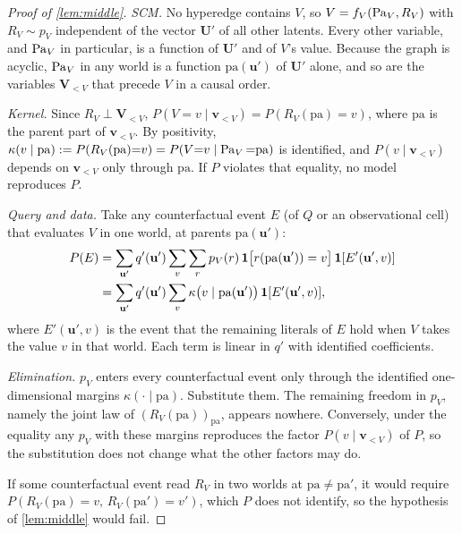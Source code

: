 \begin{proof}[Proof of \cref{lem:middle}]
\emph{SCM.} No hyperedge contains $V$, so $V=f_V(\operatorname{Pa}_V,R_V)$ with
$R_V\sim p_V$ independent of the vector $\mathbf{U}'$ of all other latents.
Every other variable, and $\operatorname{Pa}_V$ in particular, is a function of
$\mathbf{U}'$ and of $V$'s value. Because the graph is acyclic, $\operatorname{Pa}_V$ in
any world is a function $\mathrm{pa}(\mathbf{u}')$ of $\mathbf{U}'$ alone, and
so are the variables $\mathbf{V}_{<V}$ that precede $V$ in a causal order.

\emph{Kernel.} Since $R_V\perp\mathbf{V}_{<V}$,
$P(V{=}v\mid\mathbf{v}_{<V})=P(R_V(\mathrm{pa}){=}v)$, where $\mathrm{pa}$ is
the parent part of $\mathbf{v}_{<V}$. By positivity,
$\kappa(v\mid\mathrm{pa}):=P(R_V(\mathrm{pa}){=}v)=P(V{=}v\mid\operatorname{Pa}_V{=}\mathrm{pa})$
is identified, and $P(v\mid\mathbf{v}_{<V})$ depends on $\mathbf{v}_{<V}$ only
through $\mathrm{pa}$. If $P$ violates that equality, no model reproduces $P$.

\emph{Query and data.} Take any counterfactual event $E$ (of $Q$ or an observational cell)
that evaluates $V$ in one world, at parents $\mathrm{pa}(\mathbf{u}')$:
\begin{align*}
P(E)&=\sum_{\mathbf{u}'}q'(\mathbf{u}')\sum_{v}\sum_{r}p_V(r)\,
\mathbf{1}\bigl[r(\mathrm{pa}(\mathbf{u}'))=v\bigr]\,
\mathbf{1}[E'(\mathbf{u}',v)]\\
&=\sum_{\mathbf{u}'}q'(\mathbf{u}')\sum_v
\kappa\bigl(v\mid\mathrm{pa}(\mathbf{u}')\bigr)\,
\mathbf{1}[E'(\mathbf{u}',v)],
\end{align*}
where $E'(\mathbf{u}',v)$ is the event that the remaining literals of $E$
hold when $V$ takes the value $v$ in that world. Each term is linear in $q'$
with identified coefficients.

\emph{Elimination.} $p_V$ enters every counterfactual event only through the identified
one-dimensional margins $\kappa(\cdot\mid\mathrm{pa})$. Substitute them. The
remaining freedom in $p_V$, namely the joint law of $(R_V(\mathrm{pa}))_{\mathrm{pa}}$,
appears nowhere. Conversely, under the equality any $p_V$ with these margins
reproduces the factor $P(v\mid\mathbf{v}_{<V})$ of $P$, so the substitution
does not change what the other factors may do.

If some counterfactual event read $R_V$ in two worlds at $\mathrm{pa}\neq\mathrm{pa}'$, it
would require $P(R_V(\mathrm{pa}){=}v,\allowbreak\,R_V(\mathrm{pa}'){=}v')$, which $P$ does
not identify, so the hypothesis of \cref{lem:middle} would fail.
\end{proof}

